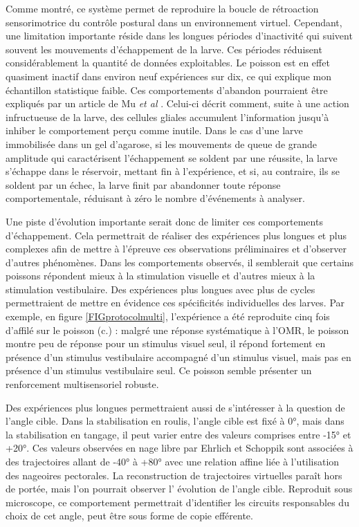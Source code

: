 Comme montré, ce système permet de reproduire la boucle de rétroaction sensorimotrice du contrôle postural dans un environnement virtuel. Cependant, une limitation importante réside dans les longues périodes d'inactivité qui suivent souvent les mouvements d'échappement de la larve. 
Ces périodes réduisent considérablement la quantité de données exploitables. Le poisson est en effet quasiment inactif dans environ neuf expériences sur dix, ce qui explique mon échantillon statistique faible.
Ces comportements d'abandon pourraient être expliqués par un article de Mu \emph{et al} \cite{mu_glia_2019}. Celui-ci décrit comment, suite à une action infructueuse de la larve, des cellules gliales accumulent l'information jusqu'à inhiber le comportement perçu comme inutile.
Dans le cas d'une larve immobilisée dans un gel d'agarose, si les mouvements de queue de grande amplitude qui caractérisent l'échappement se soldent par une réussite, la larve s'échappe dans le réservoir, mettant fin à l'expérience, et si, au contraire, ils se soldent par un échec, la larve finit par abandonner toute réponse comportementale, réduisant à zéro le nombre d'événements à analyser.

Une piste d'évolution importante serait donc de limiter ces comportements d'échappement. Cela permettrait de réaliser des expériences plus longues et plus complexes afin de mettre à l'épreuve ces observations préliminaires et d'observer d'autres phénomènes.
Dans les comportements observés, il semblerait que certains poissons répondent mieux à la stimulation visuelle et d'autres mieux à la stimulation vestibulaire. Des expériences plus longues avec plus de cycles permettraient de mettre en évidence ces spécificités individuelles des larves. Par exemple, en figure \ref{FIGprotocolmulti}, l'expérience a été reproduite cinq fois d'affilé sur le poisson (c.) : malgré une réponse systématique à l'OMR, le poisson montre peu de réponse pour un stimulus visuel seul, il répond fortement en présence d'un stimulus vestibulaire accompagné d'un stimulus visuel, mais pas en présence d'un stimulus vestibulaire seul. Ce poisson semble présenter un renforcement multisensoriel robuste.

Des expériences plus longues permettraient aussi de s'intéresser à la question de l'angle cible. Dans la stabilisation en roulis, l'angle cible est fixé à 0°, mais dans la stabilisation en tangage, il peut varier entre des valeurs comprises entre -15° et +20°. Ces valeurs observées en nage libre par Ehrlich et Schoppik \cite{ehrlich_primal_2019} sont associées à des trajectoires allant de -40° à +80° avec une relation affine liée à l'utilisation des nageoires pectorales. La reconstruction de trajectoires virtuelles paraît hors de portée, mais l'on pourrait observer l' évolution de l'angle cible. Reproduit sous microscope, ce comportement permettrait d'identifier les circuits responsables du choix de cet angle, peut être sous forme de copie efférente.

